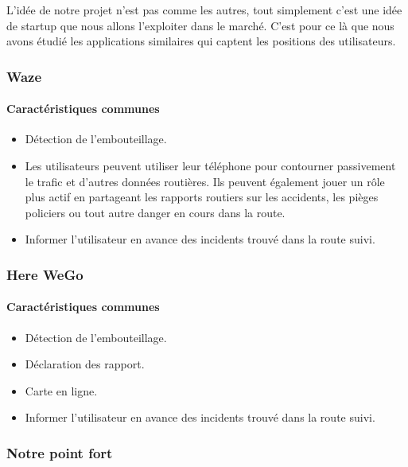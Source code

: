 L'idée de notre projet n'est pas comme les autres, tout simplement c'est une
idée de startup que nous allons l'exploiter dans le marché. C'est pour ce là
que nous avons étudié les applications similaires qui captent les positions des
utilisateurs.

\subsubsection{Waze}

\paragraph{Caractéristiques communes}

\begin{itemize}
    \item Détection de l'embouteillage.
    \item Les utilisateurs peuvent utiliser leur téléphone pour contourner
        passivement le trafic et d'autres données routières. Ils peuvent
        également jouer un rôle plus actif en partageant les rapports routiers
        sur les accidents, les pièges policiers ou tout autre danger en cours
        dans la route.
    \item Informer l'utilisateur en avance des incidents trouvé dans la route
        suivi.
\end{itemize}

\subsubsection{Here WeGo}

\paragraph{Caractéristiques communes}

\begin{itemize}
 \item Détection de l'embouteillage.
 \item Déclaration des rapport.
 \item Carte en ligne.
 \item Informer l'utilisateur en avance des incidents trouvé dans la route
        suivi.
\end{itemize}

\subsubsection{Notre point fort}

